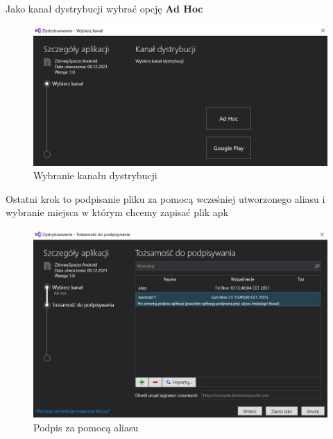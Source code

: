 \newpage
 Jako kanał dystrybucji wybrać opcję \textbf{Ad Hoc}
 \begin{figure}[!htb]
 	\begin{center}
 		\includegraphics[width=12cm]{rys/apk_4.png}
 		\caption{Wybranie kanału dystrybucji}
 		\label{rys:rysunek010}
 	\end{center}
 \end{figure}
 \newline Ostatni krok to podpisanie pliku za pomocą wcześniej utworzonego aliasu i wybranie miejsca w którym chcemy zapisać plik apk
 \begin{figure}[!htb]
 	\begin{center}
 		\includegraphics[width=12cm]{rys/apk_5.png}
 		\caption{Podpis za pomocą aliasu}
 		\label{rys:rysunek011}
 	\end{center}
 \end{figure}
 